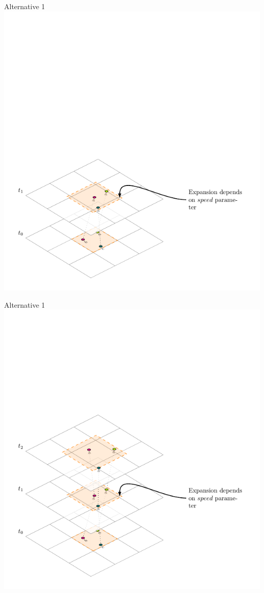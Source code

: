 \documentclass{beamer}
\begin{document}
\begin{frame}{Alternative 1}
    \centering
    \includegraphics[height=0.95\textheight]{Figures/A1/T1}
\end{frame}
\begin{frame}{Alternative 1}
    \centering
    \includegraphics[height=0.95\textheight]{Figures/A1/T2}
\end{frame}
\end{document}
